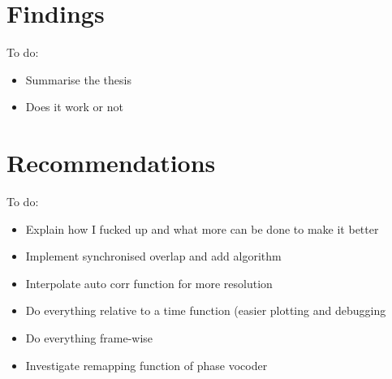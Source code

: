 
\section{Findings}

\color{red}
To do:
\begin{itemize}
	\item Summarise the thesis
	\item Does it work or not
\end{itemize}
\color{black}

\section{Recommendations}

\color{red}
To do:
\begin{itemize}
	\item Explain how I fucked up and what more can be done to make it better
	\item Implement synchronised overlap and add algorithm
	\item Interpolate auto corr function for more resolution
	\item Do everything relative to a time function (easier plotting and
		debugging
	\item Do everything frame-wise
	\item Investigate remapping function of phase vocoder
\end{itemize}
\color{black}
